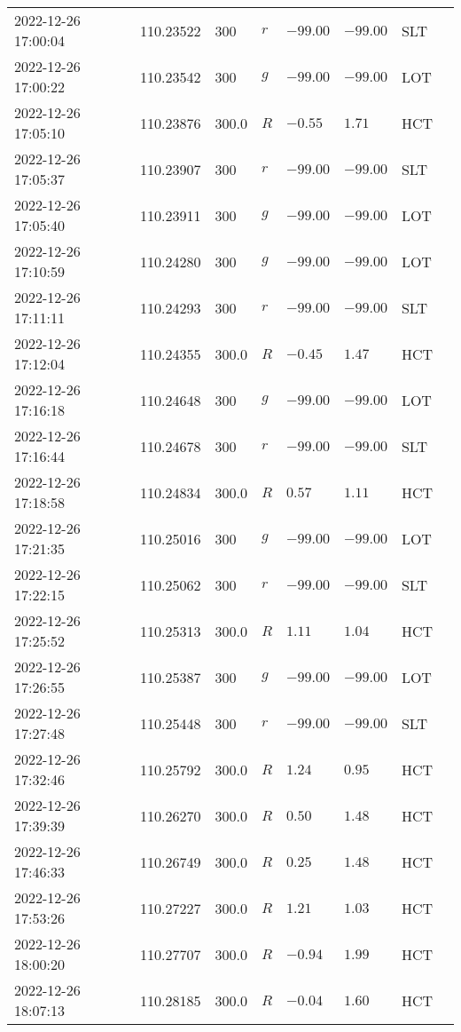 \documentclass{nature_plusfigure}
\begin{document}
\begin{supplement}
\begin{center}
\begin{longtable}{llllllll}
2022-12-26 17:00:04 & 110.23522 & 300 & $r$ & $-99.00$ & $-99.00$ & SLT &  \\ 
2022-12-26 17:00:22 & 110.23542 & 300 & $g$ & $-99.00$ & $-99.00$ & LOT &  \\ 
2022-12-26 17:05:10 & 110.23876 & 300.0 & $R$ & $-0.55$ & $1.71$ & HCT &  \\ 
2022-12-26 17:05:37 & 110.23907 & 300 & $r$ & $-99.00$ & $-99.00$ & SLT &  \\ 
2022-12-26 17:05:40 & 110.23911 & 300 & $g$ & $-99.00$ & $-99.00$ & LOT &  \\ 
2022-12-26 17:10:59 & 110.24280 & 300 & $g$ & $-99.00$ & $-99.00$ & LOT &  \\ 
2022-12-26 17:11:11 & 110.24293 & 300 & $r$ & $-99.00$ & $-99.00$ & SLT &  \\ 
2022-12-26 17:12:04 & 110.24355 & 300.0 & $R$ & $-0.45$ & $1.47$ & HCT &  \\ 
2022-12-26 17:16:18 & 110.24648 & 300 & $g$ & $-99.00$ & $-99.00$ & LOT &  \\ 
2022-12-26 17:16:44 & 110.24678 & 300 & $r$ & $-99.00$ & $-99.00$ & SLT &  \\ 
2022-12-26 17:18:58 & 110.24834 & 300.0 & $R$ & $0.57$ & $1.11$ & HCT &  \\ 
2022-12-26 17:21:35 & 110.25016 & 300 & $g$ & $-99.00$ & $-99.00$ & LOT &  \\ 
2022-12-26 17:22:15 & 110.25062 & 300 & $r$ & $-99.00$ & $-99.00$ & SLT &  \\ 
2022-12-26 17:25:52 & 110.25313 & 300.0 & $R$ & $1.11$ & $1.04$ & HCT &  \\ 
2022-12-26 17:26:55 & 110.25387 & 300 & $g$ & $-99.00$ & $-99.00$ & LOT &  \\ 
2022-12-26 17:27:48 & 110.25448 & 300 & $r$ & $-99.00$ & $-99.00$ & SLT &  \\ 
2022-12-26 17:32:46 & 110.25792 & 300.0 & $R$ & $1.24$ & $0.95$ & HCT &  \\ 
2022-12-26 17:39:39 & 110.26270 & 300.0 & $R$ & $0.50$ & $1.48$ & HCT &  \\ 
2022-12-26 17:46:33 & 110.26749 & 300.0 & $R$ & $0.25$ & $1.48$ & HCT &  \\ 
2022-12-26 17:53:26 & 110.27227 & 300.0 & $R$ & $1.21$ & $1.03$ & HCT &  \\ 
2022-12-26 18:00:20 & 110.27707 & 300.0 & $R$ & $-0.94$ & $1.99$ & HCT &  \\ 
2022-12-26 18:07:13 & 110.28185 & 300.0 & $R$ & $-0.04$ & $1.60$ & HCT &  \\ 

\end{longtable}
\end{center}
\end{supplement}
\end{document}
